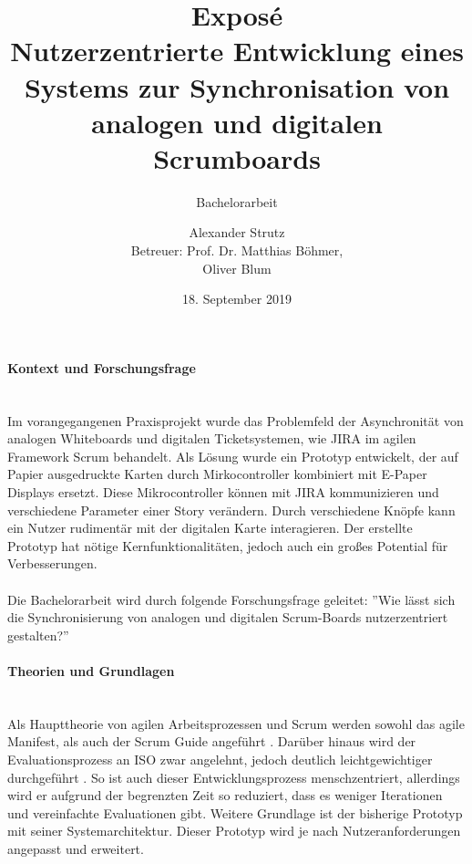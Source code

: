 \documentclass[12pt,titlepage]{scrartcl}
\begin{document}
	\begin{titlepage}
		\title{Exposé \\ \glqq Nutzerzentrierte Entwicklung eines Systems zur Synchronisation von analogen und digitalen Scrumboards\grqq{}} 
		\subtitle{Bachelorarbeit}
		\author{Alexander Strutz \vspace{0.5cm}\\ Betreuer: 
		Prof. Dr. Matthias Böhmer,\\Oliver Blum}
 		\date{18. September 2019}
		\maketitle
	\end{titlepage}
	\paragraph{Kontext und Forschungsfrage} \leavevmode \\
	Im vorangegangenen Praxisprojekt wurde das Problemfeld der Asynchronität von analogen Whiteboards und digitalen Ticketsystemen, wie JIRA im agilen Framework Scrum behandelt. Als Lösung wurde ein Prototyp entwickelt, der auf Papier ausgedruckte Karten durch Mirkocontroller kombiniert mit E-Paper Displays ersetzt. Diese Mikrocontroller können mit JIRA kommunizieren und verschiedene Parameter einer Story verändern. Durch verschiedene Knöpfe kann ein Nutzer rudimentär mit der digitalen Karte interagieren. Der erstellte Prototyp hat nötige Kernfunktionalitäten, jedoch auch ein großes Potential für Verbesserungen. \\ \\
	Die Bachelorarbeit wird durch folgende Forschungsfrage geleitet: ''Wie lässt sich die Synchronisierung von analogen und digitalen Scrum-Boards nutzerzentriert gestalten?''
	\paragraph{Theorien und Grundlagen} \leavevmode \\
	Als Haupttheorie von agilen Arbeitsprozessen und Scrum werden sowohl das agile Manifest, als auch der Scrum Guide angeführt \cite{guide}. Darüber hinaus wird der Evaluationsprozess an ISO zwar angelehnt, jedoch deutlich leichtgewichtiger durchgeführt \cite{ISO15288}. So ist auch dieser Entwicklungsprozess menschzentriert, allerdings wird er aufgrund der begrenzten Zeit so reduziert, dass es weniger Iterationen und vereinfachte Evaluationen gibt. Weitere Grundlage ist der bisherige Prototyp mit seiner Systemarchitektur. Dieser Prototyp wird je nach Nutzeranforderungen angepasst und erweitert. 
\end{document}
